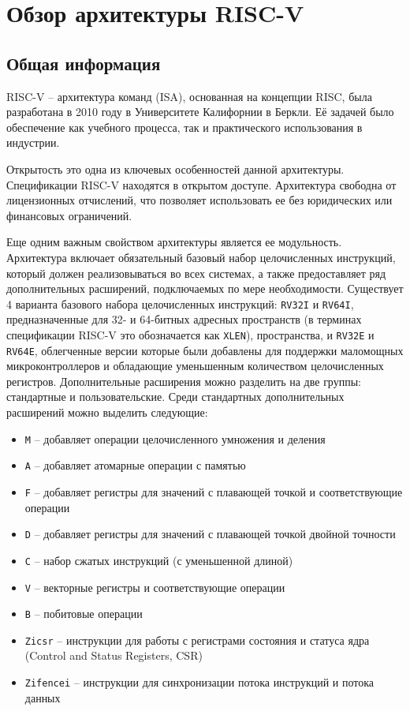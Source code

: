 \section{Обзор архитектуры RISC-V}
\label{riscv} 

\subsection {Общая информация}
\label{riscv:general}

RISC-V -- архитектура команд (ISA), основанная на концепции RISC,
была разработана в 2010 году в Университете
Калифорнии в Беркли. Её задачей было обеспечение как учебного процесса, так и
практического использования в индустрии.

Открытость это одна из ключевых особенностей данной архитектуры. Спецификации
RISC-V находятся в открытом доступе. Архитектура свободна от лицензионных отчислений,
что позволяет использовать ее без юридических или финансовых ограничений.

Еще одним важным свойством архитектуры является ее модульность. Архитектура включает
обязательный базовый набор целочисленных инструкций, который должен реализовываться
во всех системах, а также предоставляет ряд дополнительных расширений, подключаемых
по мере необходимости. Существует 4 варианта базового набора целочисленных
инструкций: \texttt{RV32I} и \texttt{RV64I}, предназначенные для 32- и 64-битных
адресных пространств (в терминах спецификации RISC-V это обозначается как \texttt{XLEN}),
пространства, и \texttt{RV32E} и \texttt{RV64E}, облегченные версии
которые были добавлены для поддержки
маломощных микроконтроллеров и обладающие уменьшенным количеством целочисленных регистров.
Дополнительные расширения можно разделить на две группы: стандартные и пользовательские.
Среди стандартных дополнительных расширений можно выделить следующие:

\begin{itemize}
	\item \texttt{M} -- добавляет операции целочисленного умножения и деления
	\item \texttt{A} -- добавляет атомарные операции с памятью
	\item \texttt{F} -- добавляет регистры для значений с плавающей точкой и соответствующие
	операции
	\item \texttt{D} -- добавляет регистры для значений с плавающей точкой двойной точности
	\item \texttt{C} -- набор сжатых инструкций (с уменьшенной длиной)
	\item \texttt{V} -- векторные регистры и соответствующие операции
	\item \texttt{B} -- побитовые операции
	\item \texttt{Zicsr} -- инструкции для работы с регистрами состояния и статуса
	ядра (Control and Status Registers, CSR)
	\item \texttt{Zifencei} -- инструкции для синхронизации потока инструкций и
	потока данных
\end{itemize}

